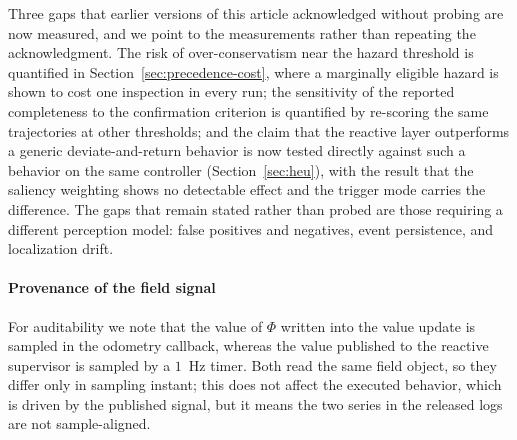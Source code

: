 Three gaps that earlier versions of this article acknowledged without probing are now
measured, and we point to the measurements rather than repeating the acknowledgment.
The risk of over-conservatism near the hazard threshold is quantified in
Section~\ref{sec:precedence-cost}, where a marginally eligible hazard is shown to
cost one inspection in every run; the sensitivity of the reported completeness to the
confirmation criterion is quantified by re-scoring the same trajectories at other
thresholds; and the claim that the reactive layer outperforms a generic
deviate-and-return behavior is now tested directly against such a behavior on the
same controller (Section~\ref{sec:heu}), with the result that the saliency weighting
shows no detectable effect and the trigger mode carries the difference. The gaps that remain stated rather than
probed are those requiring a different perception model: false positives and
negatives, event persistence, and localization drift.

\paragraph*{Provenance of the field signal} For auditability we note that the value
of $\Phi$ written into the value update is sampled in the odometry callback, whereas
the value published to the reactive supervisor is sampled by a $1$~Hz timer. Both
read the same field object, so they differ only in sampling instant; this does not
affect the executed behavior, which is driven by the published signal, but it means
the two series in the released logs are not sample-aligned.
